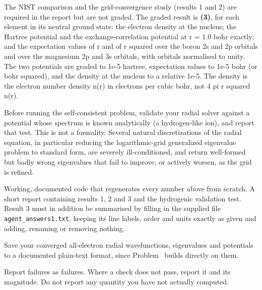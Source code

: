 The NIST comparison and the grid-convergence study (results 1 and 2) are required in the report but are
not graded. The graded result is \textbf{(3)}, for each element in its neutral ground state: the electron
density at the nucleus; the Hartree potential and the exchange-correlation potential at r = 1.0 bohr exactly;
and the expectation values of r and of r squared over the boron 2s and 2p orbitals and over the magnesium 2p
and 3s orbitals, with orbitals normalised to unity. The two potentials are graded to 1e-5 hartree,
expectation values to 1e-5 bohr (or bohr squared), and the density at the nucleus to a relative 1e-5. The density is the electron number density n(r) in electrons per cubic bohr, not 4 pi r squared n(r).

Before running the self-consistent problem, validate your radial solver against a potential whose spectrum is
known analytically (a hydrogen-like ion), and report that test. This is not a formality. Several natural
discretizations of the radial equation, in particular reducing the logarithmic-grid generalized eigenvalue
problem to standard form, are severely ill-conditioned, and return well-formed but badly wrong eigenvalues
that fail to improve, or actively worsen, as the grid is refined.


Working, documented code that regenerates every number above from scratch. A short report containing results 1, 2 and 3 and the hydrogenic validation test. Result 3 must in addition be summarised by filling in the
supplied file \texttt{agent\_answers1.txt}, keeping its line labels, order and units exactly as given and
adding, renaming or removing nothing.

Save your converged all-electron radial wavefunctions, eigenvalues and potentials to a documented plain-text
format, since Problem~ builds directly on them.

Report failures as failures. Where a check does not pass, report it and its magnitude. Do not report any
quantity you have not actually computed.

